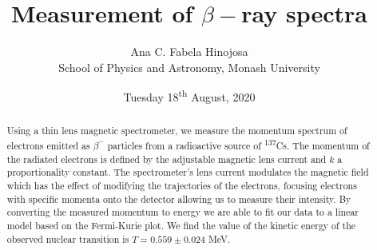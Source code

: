\documentclass[12pt,a4paper]{article}
\title{Measurement of $\beta-$ray spectra}
\author{Ana C. Fabela Hinojosa\\
\small{School of Physics and Astronomy, Monash University}}
\date{Tuesday 18\textsuperscript{th} August, 2020}
\begin{document}
\maketitle
\begin{abstract}
Using a thin lens magnetic spectrometer, we measure the momentum spectrum of electrons emitted as $\beta^{-}$ particles from a radioactive source of  \textsuperscript{137}Cs. 
The momentum of the radiated electrons is defined by the adjustable magnetic lens current and $k$ a proportionality constant. The spectrometer's lens current modulates the magnetic field which has the effect of modifying the trajectories of the electrons, focusing electrons with specific momenta onto the detector allowing us to measure their intensity. By converting the measured momentum to energy we are able to fit our data to a linear model based on the Fermi-Kurie plot. We find the value of the kinetic energy of the observed nuclear transition is $T = 0.559 \pm 0.024$ MeV.
\end{abstract}
\end{document}
